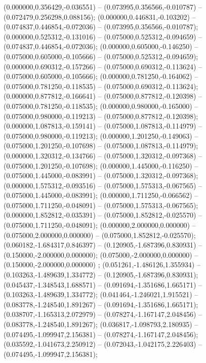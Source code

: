  (0.000000,0.356429,-0.036551) -- (0.073995,0.356566,-0.010787) -- (0.072479,0.256298,0.088156);
 (0.000000,0.446831,-0.103202) -- (0.074837,0.446854,-0.072036) -- (0.073995,0.356566,-0.010787);
 (0.000000,0.525312,-0.131016) -- (0.075000,0.525312,-0.094659) -- (0.074837,0.446854,-0.072036);
 (0.000000,0.605000,-0.146250) -- (0.075000,0.605000,-0.105666) -- (0.075000,0.525312,-0.094659);
 (0.000000,0.690312,-0.157266) -- (0.075000,0.690312,-0.113624) -- (0.075000,0.605000,-0.105666);
 (0.000000,0.781250,-0.164062) -- (0.075000,0.781250,-0.118535) -- (0.075000,0.690312,-0.113624);
 (0.000000,0.877812,-0.166641) -- (0.075000,0.877812,-0.120398) -- (0.075000,0.781250,-0.118535);
 (0.000000,0.980000,-0.165000) -- (0.075000,0.980000,-0.119213) -- (0.075000,0.877812,-0.120398);
 (0.000000,1.087813,-0.159141) -- (0.075000,1.087813,-0.114979) -- (0.075000,0.980000,-0.119213);
 (0.000000,1.201250,-0.149063) -- (0.075000,1.201250,-0.107698) -- (0.075000,1.087813,-0.114979);
 (0.000000,1.320312,-0.134766) -- (0.075000,1.320312,-0.097368) -- (0.075000,1.201250,-0.107698);
 (0.000000,1.445000,-0.116250) -- (0.075000,1.445000,-0.083991) -- (0.075000,1.320312,-0.097368);
 (0.000000,1.575312,-0.093516) -- (0.075000,1.575313,-0.067565) -- (0.075000,1.445000,-0.083991);
 (0.000000,1.711250,-0.066562) -- (0.075000,1.711250,-0.048091) -- (0.075000,1.575313,-0.067565);
 (0.000000,1.852812,-0.035391) -- (0.075000,1.852812,-0.025570) -- (0.075000,1.711250,-0.048091);
 (0.000000,2.000000,0.000000) -- (0.075000,2.000000,0.000000) -- (0.075000,1.852812,-0.025570);
 (0.060182,-1.684317,0.846397) -- (0.120905,-1.687396,0.830931) -- (0.150000,-2.000000,0.000000);
 (0.075000,-2.000000,0.000000) -- (0.150000,-2.000000,0.000000) ;
 (0.051261,-1.486126,1.355934) -- (0.103263,-1.489639,1.334772) -- (0.120905,-1.687396,0.830931);
 (0.045437,-1.348543,1.688571) -- (0.091694,-1.351686,1.665171) -- (0.103263,-1.489639,1.334772);
 (0.041464,-1.246021,1.915521) -- (0.083778,-1.248540,1.891267) -- (0.091694,-1.351686,1.665171);
 (0.038707,-1.165313,2.072979) -- (0.078274,-1.167147,2.048456) -- (0.083778,-1.248540,1.891267);
 (0.036817,-1.098793,2.180935) -- (0.074495,-1.099947,2.156381) -- (0.078274,-1.167147,2.048456);
 (0.035592,-1.041673,2.250912) -- (0.072043,-1.042175,2.226403) -- (0.074495,-1.099947,2.156381);
